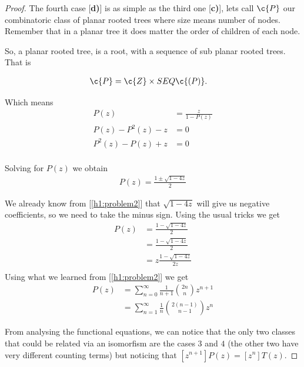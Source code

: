 \begin{proof}
    The fourth case [\textbf{d)}] is as simple as the third one [\textbf{c)}], lets call $\c{P}$ our combinatoric class of planar rooted trees where size means number
    of nodes. Remember that in a planar tree it does matter the order of children of each node.\pn
    
    So, a planar rooted tree, is a root, with a sequence of sub planar rooted trees. That is
    
    \begin{align}
        \c{P}   &= \c{Z} \times SEQ\c{(P)}. 
    \end{align}\pn
    
    Which means
    \begin{align}
        P(z)               &=  \frac{z}{1 - P(z)}  \\
        P(z) - P^2(z) - z  &=  0                   \\
        P^2(z) - P(z) + z  &=  0                   \\
    \end{align}\pn
    
    Solving for $P(z)$ we obtain
    \begin{align}
        P(z) = \frac{1 \pm \sqrt{ 1 - 4z}}{2}
    \end{align}
    
    We already know from [\ref{h1:problem2}] that $\sqrt{ 1 - 4z}$ will give us negative coefficients, so we need to take the minus sign.
    Using the usual tricks we get
    \begin{align}
       P(z)     &=  \frac{1 - \sqrt{ 1 - 4z}}{2}      \\
                &=  \frac{1 - \sqrt{ 1 - 4z}}{2}      \\
                &=  z \frac{1 - \sqrt{ 1 - 4z}}{2z}   \\
    \end{align}
     Using what we learned from [\ref{h1:problem2}] we get
    \begin{align}
       P(z)     &= \sum_{n = 0}^{\infty} \frac{1}{n+1} \binom{2n}{n} z^{n + 1}    \\
                &= \sum_{n = 1}^{\infty} \frac{1}{n} \binom{2(n-1)}{n-1} z^{n}
    \end{align}
    
    From analysing the functional equations, we can notice that the only two classes that could be related via an isomorfism
    are the cases $3$ and $4$ (the other two have very different counting terms) but noticing that $[z^{n + 1}] P(z) = [z^n] T(z)$.\pn
    

\end{proof}

